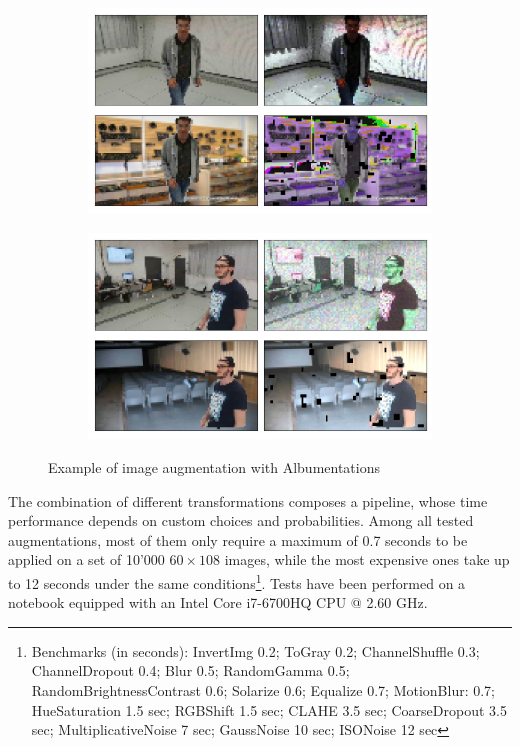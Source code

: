 \begin{figure}[!h]
	\begin{center}
		\begin{subfigure}[h]{0.49\textwidth}
			\centering
			\includegraphics[width=1\textwidth]{"contents/images/05-imgaug-example-1"}
		\end{subfigure}
		\hfill
		\begin{subfigure}[h]{0.49\textwidth}
			\centering
			\includegraphics[width=1\textwidth]{"contents/images/05-imgaug-example-2"}
		\end{subfigure}
	\end{center}
	\vspace{-0.5cm}
	\caption[Example of image augmentation with Albumentations]{Example of image augmentation with Albumentations}
	\label{fig:albumentation-example}
\end{figure}

The combination of different transformations composes a pipeline, whose time performance depends on custom choices and probabilities. Among all tested augmentations, most of them only require a maximum of 0.7 seconds to be applied on a set of 10'000 $60 \times 108$ images, while the most expensive ones take up to 12 seconds under the same conditions\footnote{Benchmarks (in seconds): InvertImg 0.2; ToGray 0.2; ChannelShuffle 0.3; ChannelDropout 0.4; Blur 0.5; RandomGamma 0.5; RandomBrightnessContrast 0.6; Solarize 0.6; Equalize 0.7; MotionBlur: 0.7; HueSaturation 1.5 sec; RGBShift 1.5 sec; CLAHE 3.5 sec; CoarseDropout 3.5 sec; MultiplicativeNoise 7 sec; GaussNoise 10 sec; ISONoise 12 sec}. Tests have been performed on a notebook equipped with an Intel Core i7-6700HQ CPU @ 2.60 GHz.

